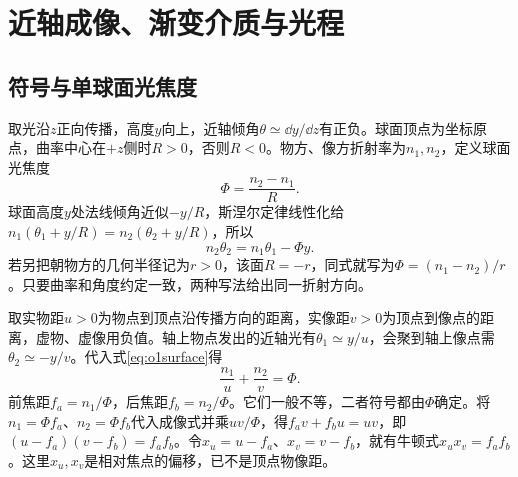 \chapter{近轴成像、渐变介质与光程}
\section{符号与单球面光焦度}\label{th:o1power}
取光沿$z$正向传播，高度$y$向上，近轴倾角$\theta\simeq\dd y/\dd z$有正负。球面顶点为坐标原点，曲率中心在$+z$侧时$R>0$，否则$R<0$。物方、像方折射率为$n_1,n_2$，定义球面光焦度
\[
 \Phi=\frac{n_2-n_1}{R}.
\]
球面高度$y$处法线倾角近似$-y/R$，斯涅尔定律线性化给$n_1(\theta_1+y/R)=n_2(\theta_2+y/R)$，所以
\begin{equation}\label{eq:o1surface}
 n_2\theta_2=n_1\theta_1-\Phi y.
\end{equation}
若另把朝物方的几何半径记为$r>0$，该面$R=-r$，同式就写为$\Phi=(n_1-n_2)/r$。只要曲率和角度约定一致，两种写法给出同一折射方向。

取实物距$u>0$为物点到顶点沿传播方向的距离，实像距$v>0$为顶点到像点的距离，虚物、虚像用负值。轴上物点发出的近轴光有$\theta_1\simeq y/u$，会聚到轴上像点需$\theta_2\simeq-y/v$。代入式\eqref{eq:o1surface}得
\begin{equation}\label{eq:o1gauss}
 \frac{n_1}u+\frac{n_2}v=\Phi.
\end{equation}
前焦距$f_a=n_1/\Phi$，后焦距$f_b=n_2/\Phi$。它们一般不等，二者符号都由$\Phi$确定。将$n_1=\Phi f_a$、$n_2=\Phi f_b$代入成像式并乘$uv/\Phi$，得$f_av+f_bu=uv$，即$(u-f_a)(v-f_b)=f_af_b$。令$x_u=u-f_a$、$x_v=v-f_b$，就有牛顿式$x_ux_v=f_af_b$。这里$x_u,x_v$是相对焦点的偏移，已不是顶点物像距。


